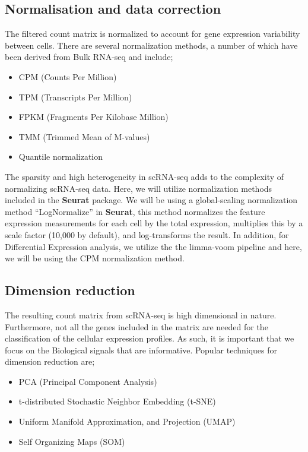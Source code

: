 \documentclass[
  openany]{book}
\providecommand{\tightlist}{%
  \setlength{\itemsep}{0pt}\setlength{\parskip}{0pt}}
\begin{document}
\hypertarget{normalisation-and-data-correction}{%
\subsection{Normalisation and data correction}\label{normalisation-and-data-correction}}

The filtered count matrix is normalized to account for gene expression variability between cells. There are several normalization methods, a number of which have been derived from Bulk RNA-seq and include;

\begin{itemize}
\tightlist
\item
  CPM (Counts Per Million)
\item
  TPM (Transcripts Per Million)
\item
  FPKM (Fragments Per Kilobase Million)
\item
  TMM (Trimmed Mean of M-values)
\item
  Quantile normalization
\end{itemize}

The sparsity and high heterogeneity in scRNA-seq adds to the complexity of normalizing scRNA-seq data. Here, we will utilize normalization methods included in the \textbf{Seurat} package. We will be using a global-scaling normalization method ``LogNormalize'' in \textbf{Seurat}, this method normalizes the feature expression measurements for each cell by the total expression, multiplies this by a scale factor (10,000 by default), and log-transforms the result. In addition, for Differential Expression analysis, we utilize the the limma-voom pipeline \citep[law2014voom]{ritchie2015limma} and here, we will be using the CPM normalization method.

\hypertarget{dimension-reduction}{%
\subsection{Dimension reduction}\label{dimension-reduction}}

The resulting count matrix from scRNA-seq is high dimensional in nature. Furthermore, not all the genes included in the matrix are needed for the classification of the cellular expression profiles. As such, it is important that we focus on the Biological signals that are informative. Popular techniques for dimension reduction are;

\begin{itemize}
\tightlist
\item
  PCA (Principal Component Analysis)
\item
  t-distributed Stochastic Neighbor Embedding (t-SNE)
\item
  Uniform Manifold Approximation, and Projection (UMAP)
\item
  Self Organizing Maps (SOM)
\end{itemize}
\end{document}
